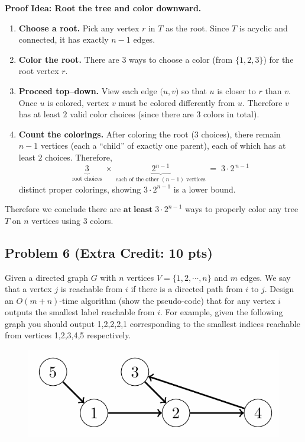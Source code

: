 \documentclass[12pt]{article}
\begin{document}
\medskip
\noindent
\textbf{Proof Idea: Root the tree and color downward.}
\begin{enumerate}
  \item \textbf{Choose a root.} 
  Pick any vertex \(r\) in \(T\) as the root. Since \(T\) is acyclic and connected, it has exactly \(n-1\) edges.

  \item \textbf{Color the root.} 
  There are \(3\) ways to choose a color (from \(\{1,2,3\}\)) for the root vertex \(r\).

  \item \textbf{Proceed top--down.} 
  View each edge \(\bigl(u,v\bigr)\) so that \(u\) is closer to \(r\) than \(v\). Once \(u\) is colored, vertex \(v\) must be colored differently from \(u\). Therefore \(v\) has at least \(2\) valid color choices (since there are 3 colors in total).

  \item \textbf{Count the colorings.}
  After coloring the root (3 choices), there remain \(n-1\) vertices (each a “child” of exactly one parent), each of which has at least \(2\) choices. Therefore, 
  \[
     \underbrace{3}_{\text{root choices}} 
     \;\times\; 
     \underbrace{2^{n-1}}_{\text{each of the other }(n-1)\text{ vertices}}
     \;=\; 3\cdot 2^{\,n-1}
  \]
  distinct proper colorings, showing \(\displaystyle 3\cdot 2^{n-1}\) is a lower bound.
\end{enumerate}

\noindent
Therefore we conclude there are \(\mathbf{at~least}\; 3\cdot 2^{n-1}\) ways to properly color any tree \(T\) on \(n\) vertices using 3 colors.

\subsection*{Problem 6 (Extra Credit: 10 pts)}
Given a directed graph $G$ with $n$ vertices $V = \{1,2,\cdots,n\}$ and $m$ edges. We say that a vertex $j$ is reachable from $i$ if there is a directed path from $i$ to $j$. Design an $O(m+n)$-time algorithm (show the pseudo-code) that for any vertex $i$ outputs the smallest label reachable from $i$. For example, given the following graph you should output 1,2,2,2,1 corresponding to the smallest indices reachable from vertices 1,2,3,4,5 respectively.
\begin{figure}[H]
    \centering
    \includegraphics[width=0.5\linewidth]{P6.png}
    \label{fig:P6}
\end{figure}
\end{document}

